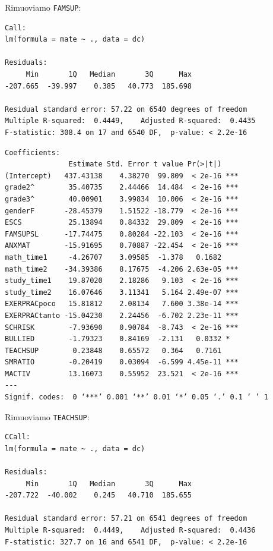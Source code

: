 \documentclass{beamer}
\begin{document}
\begin{frame}[fragile]
Rimuoviamo \texttt{FAMSUP}:
{\scriptsize
\begin{verbatim}
Call:
lm(formula = mate ~ ., data = dc)

Residuals:
     Min       1Q   Median       3Q      Max 
-207.665  -39.997    0.385   40.773  185.698 

Residual standard error: 57.22 on 6540 degrees of freedom
Multiple R-squared:  0.4449,	Adjusted R-squared:  0.4435 
F-statistic: 308.4 on 17 and 6540 DF,  p-value: < 2.2e-16
\end{verbatim}
}
\end{frame}

\begin{frame}[fragile]

{\tiny
\begin{verbatim}
Coefficients:
               Estimate Std. Error t value Pr(>|t|)    
(Intercept)   437.43138    4.38270  99.809  < 2e-16 ***
grade2^        35.40735    2.44466  14.484  < 2e-16 ***
grade3^        40.00901    3.99834  10.006  < 2e-16 ***
genderF       -28.45379    1.51522 -18.779  < 2e-16 ***
ESCS           25.13894    0.84332  29.809  < 2e-16 ***
FAMSUPSL      -17.74475    0.80284 -22.103  < 2e-16 ***
ANXMAT        -15.91695    0.70887 -22.454  < 2e-16 ***
math_time1     -4.26707    3.09585  -1.378   0.1682    
math_time2    -34.39386    8.17675  -4.206 2.63e-05 ***
study_time1    19.87020    2.18286   9.103  < 2e-16 ***
study_time2    16.07646    3.11341   5.164 2.49e-07 ***
EXERPRACpoco   15.81812    2.08134   7.600 3.38e-14 ***
EXERPRACtanto -15.04230    2.24456  -6.702 2.23e-11 ***
SCHRISK        -7.93690    0.90784  -8.743  < 2e-16 ***
BULLIED        -1.79323    0.84169  -2.131   0.0332 *  
TEACHSUP        0.23848    0.65572   0.364   0.7161    
SMRATIO        -0.20419    0.03094  -6.599 4.45e-11 ***
MACTIV         13.16073    0.55952  23.521  < 2e-16 ***
---
Signif. codes:  0 ‘***’ 0.001 ‘**’ 0.01 ‘*’ 0.05 ‘.’ 0.1 ‘ ’ 1
\end{verbatim}
}
\end{frame}

\begin{frame}[fragile]
Rimuoviamo \texttt{TEACHSUP}:
{\scriptsize
\begin{verbatim}
CCall:
lm(formula = mate ~ ., data = dc)

Residuals:
     Min       1Q   Median       3Q      Max 
-207.722  -40.002    0.245   40.710  185.655 

Residual standard error: 57.21 on 6541 degrees of freedom
Multiple R-squared:  0.4449,	Adjusted R-squared:  0.4436 
F-statistic: 327.7 on 16 and 6541 DF,  p-value: < 2.2e-16
\end{verbatim}
}
\end{frame}
\end{document}
